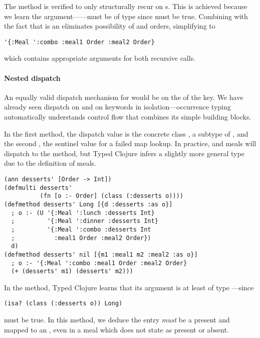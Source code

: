 The  method is verified to only structurally recur
on s. This is achieved because we learn the argument------must %
be of type
since
must be true. Combining 
with the fact that  is an 
eliminates possibility of  and 
orders, simplifying  to
\begin{verbatim}
'{:Meal ':combo :meal1 Order :meal2 Order}
\end{verbatim}
which contains appropriate arguments for both recursive calls.

\paragraph{Nested dispatch}
An equally valid dispatch mechanism for 
would be on the  of the  key.
We have already seen dispatch on  and on keywords
in isolation---occurrence typing automatically understands
control flow that combines its simple building blocks.

In the first method, the dispatch value is the concrete class , a subtype
of , and the second , the sentinel value for a failed map lookup.
In practice,  and  meals will dispatch to the 
method, but Typed Clojure infers a slightly more general type due to the definition
of  meals.

\begin{exmp}
\begin{verbatim}
(ann desserts' [Order -> Int])
(defmulti desserts' 
          (fn [o :- Order] (class (:desserts o))))
(defmethod desserts' Long [{d :desserts :as o}] 
  ; o :- (U '{:Meal ':lunch :desserts Int}
  ;         '{:Meal ':dinner :desserts Int}
  ;         '{:Meal ':combo :desserts Int
  ;           :meal1 Order :meal2 Order})
  d)
(defmethod desserts' nil [{m1 :meal1 m2 :meal2 :as o}]
  ; o :- '{:Meal ':combo :meal1 Order :meal2 Order}
  (+ (desserts' m1) (desserts' m2)))
\end{verbatim}
\label{example:desserts-on-class}
\end{exmp}
%

In the  method, Typed Clojure learns that
its argument is at least of type ---since
\begin{verbatim}
(isa? (class (:desserts o)) Long)
\end{verbatim}
must be true.
%
In this method, we deduce
the entry 
\emph{must} be a present and mapped to an ,
even in a  meal
which does not state 
as present or absent.

